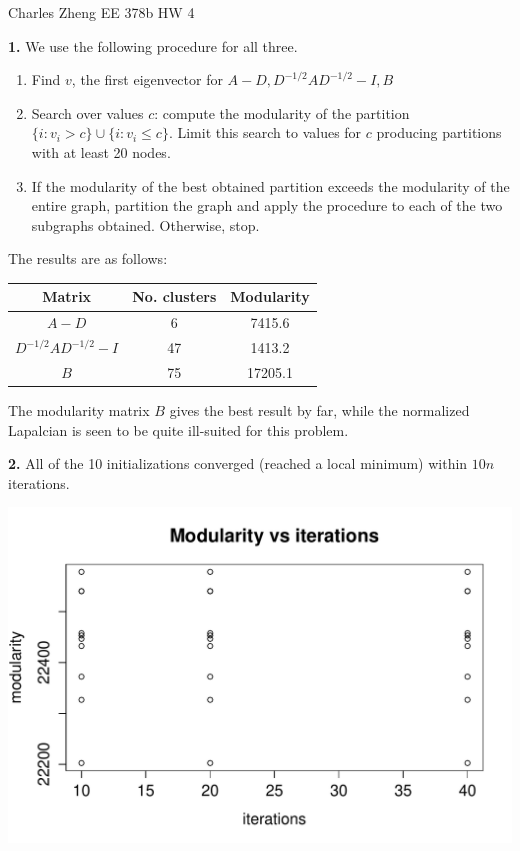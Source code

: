 \documentclass[11pt]{article}
\begin{document}
\newcommand{\tr}{\text{tr}}
\newcommand{\E}{\textbf{E}}
\newcommand{\diag}{\text{diag}}
\newcommand{\argmax}{\text{argmax}}
\newcommand{\Cov}{\text{Cov}}
\newcommand{\Var}{\text{Var}}
\renewcommand{\thefootnote}{\fnsymbol{footnote}}

\begin{center}
\noindent Charles Zheng EE 378b HW 4
\end{center}

\noindent\textbf{1.}
We use the following procedure for all three.
\begin{enumerate}
\item Find $v$, the first eigenvector for ${A-D , D^{-1/2}AD^{-1/2}-I, B}$
\item Search over values $c$: compute the modularity of the partition $\{i: v_i > c\} \cup \{i: v_i \leq c\}$.  Limit this search to values for $c$ producing partitions with at least 20 nodes.
\item If the modularity of the best obtained partition exceeds the modularity of the entire graph, partition the graph and apply the procedure to each of the two subgraphs obtained.  Otherwise, stop.
\end{enumerate}

The results are as follows:
\begin{tabular}{c|c|c}
Matrix & No. clusters & Modularity \\ \hline
$A - D$ & 6 & 7415.6\\
$D^{-1/2}AD^{-1/2}-I$ & 47 & 1413.2\\
$B$ & 75 & 17205.1
\end{tabular}

The modularity matrix $B$ gives the best result by far, while the normalized Lapalcian is seen to be quite ill-suited for this problem.

\noindent\textbf{2.}
All of the 10 initializations converged (reached a local minimum) within $10n$ iterations.

\begin{center}
\includegraphics[scale=0.3]{figure/hw2_2.pdf}
\end{center}
\end{document}
